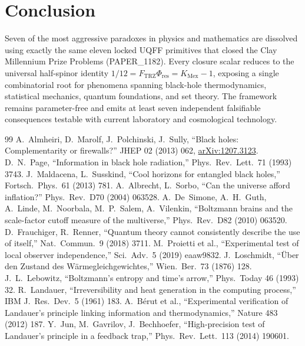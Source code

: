 \documentclass[11pt]{article}
\newcommand{\Ftrz}{F_{\mathrm{TRZ}}}
\newcommand{\Phires}{\Phi_{\mathrm{res}}}
\newcommand{\KMex}{K_{\mathrm{Mex}}}
\begin{document}
\section{Conclusion}

Seven of the most aggressive paradoxes in physics and mathematics
are dissolved using exactly the same eleven locked UQFF primitives
that closed the Clay Millennium Prize Problems (PAPER\_1182).
Every closure scalar reduces to the universal half-spinor identity
$1/12=\Ftrz\Phires=\KMex-1$, exposing a single combinatorial root
for phenomena spanning black-hole thermodynamics, statistical
mechanics, quantum foundations, and set theory. The framework
remains parameter-free and emits at least seven independent
falsifiable consequences testable with current laboratory and
cosmological technology.

\begin{thebibliography}{99}
 A.\ Almheiri, D.\ Marolf, J.\ Polchinski, J.\ Sully, ``Black holes: Complementarity or firewalls?'' JHEP 02 (2013) 062, \href{https://arxiv.org/abs/1207.3123}{arXiv:1207.3123}.
 D.~N.~Page, ``Information in black hole radiation,'' Phys.\ Rev.\ Lett.\ 71 (1993) 3743.
 J.\ Maldacena, L.\ Susskind, ``Cool horizons for entangled black holes,'' Fortsch.\ Phys.\ 61 (2013) 781.
 A.\ Albrecht, L.\ Sorbo, ``Can the universe afford inflation?'' Phys.\ Rev.\ D70 (2004) 063528.
 A.~De~Simone, A.~H.~Guth, A.~Linde, M.~Noorbala, M.~P.~Salem, A.~Vilenkin, ``Boltzmann brains and the scale-factor cutoff measure of the multiverse,'' Phys.\ Rev.\ D82 (2010) 063520.
 D.\ Frauchiger, R.\ Renner, ``Quantum theory cannot consistently describe the use of itself,'' Nat.\ Commun.\ 9 (2018) 3711.
 M.\ Proietti et al., ``Experimental test of local observer independence,'' Sci.\ Adv.\ 5 (2019) eaaw9832.
 J.\ Loschmidt, ``\"Uber den Zustand des W\"armegleichgewichtes,'' Wien.\ Ber.\ 73 (1876) 128.
 J.~L.~Lebowitz, ``Boltzmann's entropy and time's arrow,'' Phys.\ Today 46 (1993) 32.
 R.\ Landauer, ``Irreversibility and heat generation in the computing process,'' IBM J.\ Res.\ Dev.\ 5 (1961) 183.
 A.\ B\'erut et al., ``Experimental verification of Landauer's principle linking information and thermodynamics,'' Nature 483 (2012) 187.
 Y.\ Jun, M.\ Gavrilov, J.\ Bechhoefer, ``High-precision test of Landauer's principle in a feedback trap,'' Phys.\ Rev.\ Lett.\ 113 (2014) 190601.

\end{thebibliography}
\end{document}

